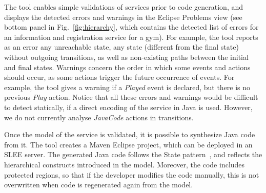 The tool enables simple validations of services prior to code generation, and displays the detected errors 
and warnings in the Eclipse Problems view (see bottom panel in Fig.~\ref{fig:hierarchy}, which contains
the detected list of errors for an information and registration service for a gym). For example, the tool reports
as an error any unreachable state, any state (different from the final state) without outgoing transitions, as well 
as non-existing paths between the initial and final states. Warnings concern the order in which some events and 
actions should occur, as some actions trigger the future occurrence of events. For example, the tool gives a 
warning if a {\em Played} event is declared, but there is no previous {\em Play} action. Notice that all these 
errors and warnings would be difficult to detect statically, if a direct encoding of the service in Java is used. 
However, we do not currently analyse {\em JavaCode} actions in transitions.

Once the model of the service is validated, it is possible to synthesize Java code from it. The tool creates a Maven 
Eclipse project, which can be deployed in an SLEE server. The generated Java code follows the State pattern~\cite{Gamma}, 
and reflects the hierarchical constructs introduced in the model. Moreover, the code includes protected regions, 
so that if the developer modifies the code manually, this is not overwritten when code is regenerated again from 
the model. 
